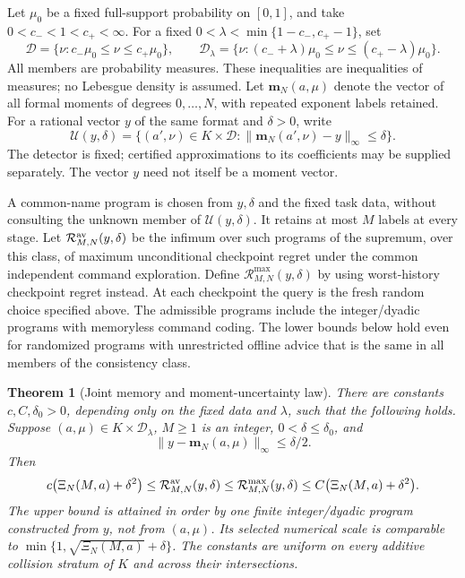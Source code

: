 \documentclass[11pt]{amsart}
\newtheorem{theorem}{Theorem}[section]
\theoremstyle{definition}\newtheorem{definition}[theorem]{Definition}
\theoremstyle{remark}\newtheorem{remark}[theorem]{Remark}
\begin{document}
Let $\mu_0$ be a fixed full-support probability on $[0,1]$, and take
$0<c_-<1<c_+<\infty$. For a fixed
$0<\lambda<\min\{1-c_-,c_+-1\}$, set
\[
 \mathcal D=\{\nu:c_-\mu_0\le\nu\le c_+\mu_0\},\qquad
 \mathcal D_\lambda=
 \{\nu:(c_-+\lambda)\mu_0\le\nu\le(c_+-\lambda)\mu_0\}.
\]
All members are probability measures. These inequalities are inequalities
of measures; no Lebesgue density is assumed. Let $\mathbf m_N(a,\mu)$
denote the vector of all formal moments of degrees $0,\ldots,N$,
with repeated exponent labels retained. For a rational vector $y$ of the
same format and $\delta>0$, write
\begin{equation}\label{eq:moment-consistency-class}
 \mathcal U(y,\delta)=\{(a',\nu)\in K\times\mathcal D:
       \|\mathbf m_N(a',\nu)-y\|_\infty\le\delta\}.
\end{equation}
The detector is fixed; certified approximations to its coefficients may
be supplied separately. The vector $y$ need not itself be a moment vector.

A common-name program is chosen from $y,\delta$ and the fixed task data,
without consulting the unknown member of $\mathcal U(y,\delta)$.
It retains at most $M$ labels at every stage. Let
$\mathcal R_{M,N}^{\rm av}(y,\delta)$ be the infimum over such programs
of the supremum, over this class, of maximum unconditional checkpoint
regret under the common independent command exploration.
Define $\mathcal R_{M,N}^{\max}(y,\delta)$ by using worst-history
checkpoint regret instead. At each checkpoint the query is the fresh
random choice specified above. The admissible programs include the
integer/dyadic programs with memoryless command coding. The lower bounds
below hold even for randomized programs with unrestricted offline advice
that is the same in all members of the consistency class.

\begin{theorem}[Joint memory and moment-uncertainty law]
\label{thm:sharp-common-moments}
There are constants $c,C,\delta_0>0$, depending only on the fixed data
and $\lambda$, such that the following holds. Suppose
$(a,\mu)\in K\times\mathcal D_\lambda$, $M\ge1$ is an integer,
$0<\delta\le\delta_0$, and
\begin{equation}\label{eq:interior-moment-name}
 \|y-\mathbf m_N(a,\mu)\|_\infty\le\delta/2.
\end{equation}
Then
\begin{equation}\label{eq:sharp-common-moments}
 c\bigl(\Xi_N(M,a)+\delta^2\bigr)
 \le \mathcal R_{M,N}^{\rm av}(y,\delta)
 \le \mathcal R_{M,N}^{\max}(y,\delta)
 \le C\bigl(\Xi_N(M,a)+\delta^2\bigr).
\end{equation}
The upper bound is attained in order by one finite integer/dyadic
program constructed from $y$, not from $(a,\mu)$. Its selected numerical
scale is comparable to
$\min\{1,\sqrt{\Xi_N(M,a)}+\delta\}$.
The constants are uniform on every additive collision stratum of $K$
and across their intersections.
\end{theorem}
\end{document}

